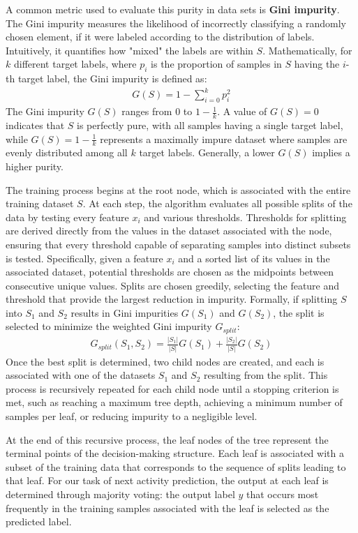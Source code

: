 A common metric used to evaluate this purity in data sets is \textbf{Gini impurity}.
The Gini impurity measures the likelihood of incorrectly classifying
a randomly chosen element, if it were labeled according to the distribution of labels.
Intuitively, it quantifies how "mixed" the labels are within $S$.
Mathematically, for $k$ different target labels,
where $p_i$ is the proportion of samples in $S$ having the $i$-th target label,
the Gini impurity is defined as:
\begin{align}
  G(S) = 1 - \sum_{i=0}^{k}p_i^2
\end{align}
The Gini impurity $G(S)$ ranges from $0$ to $1 - \frac{1}{k}$.
A value of $G(S) = 0$ indicates that $S$ is perfectly pure,
with all samples having a single target label,
while $G(S) = 1 - \frac{1}{k}$ represents a maximally impure dataset
where samples are evenly distributed among all $k$ target labels.
Generally, a lower $G(S)$ implies a higher purity.
\cite{decision_trees}

The training process begins at the root node,
which is associated with the entire training dataset $S$.
At each step, the algorithm evaluates all possible splits of the data by testing every feature $x_i$
and various thresholds.
Thresholds for splitting are derived directly from the values in the dataset associated with the node,
ensuring that every threshold capable of separating samples into distinct subsets is tested.
Specifically, given a feature $x_i$ and a sorted list of its values in the associated dataset,
potential thresholds are chosen as the midpoints between consecutive unique values.
Splits are chosen greedily, selecting the feature and threshold that provide the largest reduction in impurity.
Formally, if splitting $S$ into $S_1$ and $S_2$ results in Gini impurities $G(S_1)$ and $G(S_2)$,
the split is selected to minimize the weighted Gini impurity $G_{split}$:
\begin{align}
  G_{split}(S_1, S_2) = \frac{|S_1|}{|S|}G(S_1) + \frac{|S_2|}{|S|}G(S_2)
\end{align}
Once the best split is determined, two child nodes are created,
and each is associated with one of the datasets $S_1$ and $S_2$ resulting from the split.
This process is recursively repeated for each child node until a stopping criterion is met,
such as reaching a maximum tree depth, achieving a minimum number of samples per leaf,
or reducing impurity to a negligible level.

At the end of this recursive process,
the leaf nodes of the tree represent the terminal points of the decision-making structure.
Each leaf is associated with a subset of the training data
that corresponds to the sequence of splits leading to that leaf.
For our task of next activity prediction,
the output at each leaf is determined through majority voting:
the output label $y$ that occurs most frequently in the training samples
associated with the leaf is selected as the predicted label.


